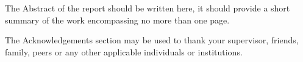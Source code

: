 \beforeabstract
{}
The Abstract of the report should be written here, it should provide a short summary of the work encompassing no more than one page.

The Acknowledgements section may be used to thank your supervisor, friends, family, peers or any other applicable individuals or institutions.

\afterpreface \afterabstract
